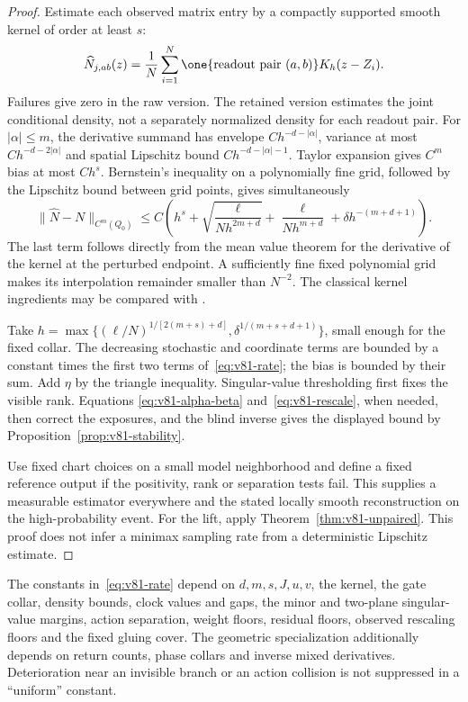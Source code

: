 \begin{proof}
Estimate each observed matrix entry by a compactly supported smooth
kernel of order at least $s$:
\[
 \widehat N_{j,ab}(z)=\frac1N\sum_{i=1}^N
             \one\{\text{readout pair }(a,b)\}K_h(z-Z_i).
\]
Failures give zero in the raw version.  The retained version estimates
the joint conditional density, not a separately normalized density for
each readout pair.  For $|\alpha|\le m$, the derivative summand has
envelope $Ch^{-d-|\alpha|}$, variance at most
$Ch^{-d-2|\alpha|}$ and spatial Lipschitz bound
$Ch^{-d-|\alpha|-1}$.  Taylor expansion gives $C^m$ bias at most $Ch^s$.
Bernstein's inequality on a polynomially fine grid, followed by the
Lipschitz bound between grid points, gives simultaneously
\begin{equation}\label{eq:v81-kernel-bound}
 \|\widehat N-N\|_{C^m(Q_0)}\le
 C\left(h^s+\sqrt{\frac{\ell}{Nh^{2m+d}}}
             +\frac{\ell}{Nh^{m+d}}+
                  \delta h^{-(m+d+1)}\right).
\end{equation}
The last term follows directly from the mean value theorem for the
derivative of the kernel at the perturbed endpoint.  A sufficiently
fine fixed polynomial grid makes its interpolation remainder smaller
than $N^{-2}$.  The classical kernel ingredients may be compared with
\cite{GineGuillou2002}.

Take
$h=\max\{(\ell/N)^{1/[2(m+s)+d]},
\delta^{1/(m+s+d+1)}\}$, small enough for the fixed collar.
The decreasing stochastic and coordinate terms are bounded by a constant
times the first two terms of~\eqref{eq:v81-rate}; the bias is bounded
by their sum.  Add $\eta$ by the triangle inequality.  Singular-value
thresholding first fixes the visible rank.  Equations
\eqref{eq:v81-alpha-beta} and~\eqref{eq:v81-rescale}, when needed,
then correct the exposures, and the blind inverse gives the displayed
bound by Proposition~\ref{prop:v81-stability}.

Use fixed chart choices on a small model neighborhood and define a fixed
reference output if the positivity, rank or separation tests fail.
This supplies a measurable estimator everywhere and the stated locally
smooth reconstruction on the high-probability event.  For the lift,
apply Theorem~\ref{thm:v81-unpaired}.  This proof does not infer a
minimax sampling rate from a deterministic Lipschitz estimate.
\end{proof}

The constants in~\eqref{eq:v81-rate} depend on $d,m,s,J,u,v$, the kernel,
the gate collar, density bounds, clock values and gaps, the minor and
two-plane singular-value margins, action separation, weight floors,
residual floors, observed rescaling floors and the fixed gluing cover.
The geometric specialization additionally depends on return counts,
phase collars and inverse mixed derivatives.  Deterioration near an
invisible branch or an action collision is not suppressed in a
``uniform'' constant.

